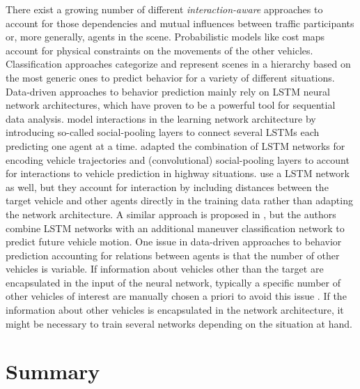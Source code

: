 There exist a growing number of different \emph{interaction-aware} approaches to account for those dependencies and mutual influences between traffic participants or, more generally, agents in the scene.
Probabilistic models like cost maps \cite{Bahram2016} account for physical constraints on the movements of the other vehicles.
Classification approaches categorize and represent scenes in a hierarchy \cite{Bonnin2012} based on the most generic ones to predict behavior for a variety of different situations.
Data-driven approaches to behavior prediction mainly rely on \ac{LSTM} neural network architectures, which have proven to be a powerful tool for sequential data analysis.
\cite{Alahi2016} model interactions in the learning network architecture by introducing so-called social-pooling layers to connect several \acp{LSTM} each predicting one agent at a time.
\cite{Deo2018a} adapted the combination of \ac{LSTM} networks for encoding vehicle trajectories and (convolutional) social-pooling layers to account for interactions to vehicle prediction in highway situations.
\cite{Altche2018} use a \ac{LSTM} network as well, but they account for interaction by including distances between the target vehicle and other agents directly in the training data rather than adapting the network architecture.
A similar approach is proposed in \cite{Deo2018}, but the authors combine \ac{LSTM} networks with an additional maneuver classification network to predict future vehicle motion.
One issue in data-driven approaches to behavior prediction accounting for relations between agents is that the number of other vehicles is variable.
If information about vehicles other than the target are encapsulated in the input of the neural network, typically a specific number of other vehicles of interest are manually chosen a priori to avoid this issue \cite{Altche2018, Deo2018}.
If the information about other vehicles is encapsulated in the network architecture, it might be necessary to train several networks depending on the situation at hand.

\section{Summary}
\label{sec:related_work_summary}
